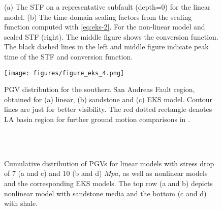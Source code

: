 \clearpage
\begin{figure}[!ht]
     \hfil
     \hfil
    \caption{(a) The STF on a representative subfault (depth=0) for the linear model. (b) The time-domain scaling factors from the scaling function computed with \cref{eq:eks-2}. For the non-linear model and scaled STF (right). The middle figure shows the conversion function. The black dashed lines in the left and middle figure indicate peak time of the STF and conversion function.}
    \label{fig:eks-3}
\end{figure}
\clearpage

\clearpage
\begin{figure}[!ht]
    \texttt{[image: figures/figure\_eks\_4.png]}
    \caption{PGV distribution for the southern San Andreas Fault region, obtained for (a) linear, (b) sandstone and (c) EKS model. Contour lines are just for better visibility. The red dotted rectangle denotes LA basin region for further ground motion comparisons in .}
    \label{fig:eks-4}
\end{figure}


\clearpage
{}
\begin{figure}[!ht]
     \hfil%
     \\[\baselineskip]%
     \hfil%
     \\[\baselineskip]

    \caption{Cumulative distribution of PGVs for linear models with stress drop of 7 (a and c) and 10 (b and d) $Mpa$, as well as nonlinear models and the corresponding EKS models. The top row (a and b) depicts nonlinear model with sandstone media and the bottom (c and d) with shale.}
    \label{fig:eks-5}
\end{figure}

